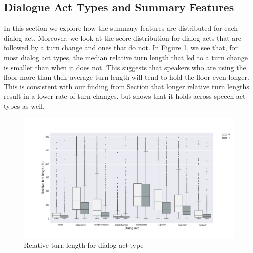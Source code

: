\subsection{Dialogue Act Types and Summary Features}

In this section we explore how the summary features are distributed for each dialog act. Moreover, we look at the score distribution for dialog acts that are followed by a turn change and ones that do not. In Figure \ref{fig:act:turn:rtl}, we see that, for most dialog act types,
the median relative turn length that led to a turn change is smaller than when it does not.  This suggests that speakers who are using the floor more than their
average turn length will tend to hold the floor even longer. This is consistent with our finding from Section \label{sec:data:summary}
that longer relative turn lengths result in a lower rate of turn-changes, but shows that it holds across speech act types as well.
%
\begin{figure}[ht!]
\centering
\includegraphics[width=\textwidth]{../scikitlearn/figures/f3.png}\vspace{-1em}
\caption{Relative turn length for dialog act type}
\label{fig:act:turn:rtl}
\end{figure}

